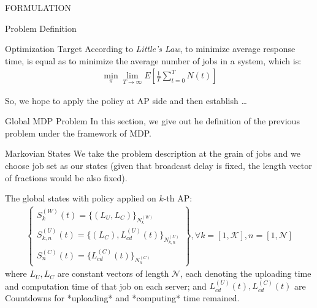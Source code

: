 \documentclass[10pt, conference, letterpaper]{IEEEtran}
\begin{document}
\begin{section}{FORMULATION}
\begin{subsection}{Problem Definition}
            \begin{subsubsection}{Optimization Target}
                According to \emph{Little’s Law}, to minimize average response time, is equal as to minimize the average number of jobs in a system, which is:
                \begin{gather}
                    \min_{\pi} \lim_{T \to \infty} E[\frac{1}{T} \sum_{t=0}^{T} N(t)]
                \end{gather}
            \end{subsubsection}

            So, we hope to apply the policy at AP side and then establish \dots
        \end{subsection}

        \begin{subsection}{Global MDP Problem}
            In this section, we give out he definition of the previous problem under the framework of MDP.

            \begin{subsubsection}{Markovian States}
                We take the problem description at the grain of jobs and we choose job set as our states (given that broadcast delay is fixed, the length vector of fractions would be also fixed).

                The global states with policy applied on $k$-th AP:
                \begin{gather*}
                    \begin{Bmatrix}
                        S_{k}^{(W)}(t) = \{ (L_U, L_C) \}_{N_{k}^{(W)}}
                        \\
                        S_{k,n}^{(U)}(t)= \{ (L_C), L_{cd}^{(U)}(t) \}_{N_{k,n}^{(U)}}
                        \\
                        S_{n}^{(C)}(t)  = \{ L_{cd}^{(C)}(t) \}_{N_{n}^{(C)}}
                    \end{Bmatrix},
                    \forall k=[1,\mathcal{K}], n=[1,\mathcal{N}]
                \end{gather*}
                where $L_U, L_C$ are constant vectors of length $\mathcal{N}$, each denoting the uploading time and computation time of that job on each server; and $L^{(U)}_{cd}(t), L^{(C)}_{cd}(t)$ are Countdowns for *uploading* and *computing* time remained.
            \end{subsubsection}


\end{subsection}
\end{section}
\end{document}
